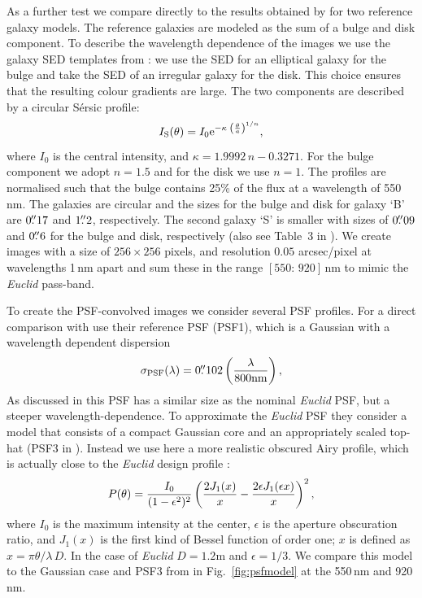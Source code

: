 \documentclass[useAMS,usenatbib]{mnras}
\newcommand{\be}{\begin{equation}}
\newcommand{\ee}{\end{equation}}
\newcommand{\rund}[1]{\left(#1\right)}
\def\elabel#1{\label{eq:#1}}
\begin{document}
As a further test we compare directly to the results obtained by  for two reference galaxy models. 
The reference galaxies are modeled as the sum of a bulge and disk component. To describe the wavelength dependence of the images we use the galaxy SED templates from \citet{1980ApJS...43..393C}: we use the SED for an elliptical galaxy for the bulge and take the SED of an irregular galaxy for the disk. This choice ensures that the resulting colour gradients are large. The two components are 
described by a circular S{\'e}rsic profile:
\be
I_{\rm S}(\theta) = I_0 {\rm e}^{-\kappa\; \left(\frac{\theta}{a}\right)^{1/n}},
\ee
%
where $I_0$ is the central intensity, and $\kappa=1.9992\,n -0.3271$. For the bulge component we adopt $n=1.5$ and for the disk we use $n=1$. The profiles are normalised such that the bulge contains 25\% of the flux at a wavelength of 550\,nm. The galaxies are circular and the sizes for the bulge and disk for galaxy `B'   are $0\hbox{$.\!\!^{\prime\prime}$}17$ and $1\hbox{$.\!\!^{\prime\prime}$}2$, respectively. The second galaxy `S' is smaller with sizes of $0\hbox{$.\!\!^{\prime\prime}$}09$ and $0\hbox{$.\!\!^{\prime\prime}$}6$  for the bulge and disk, respectively (also see Table~3 in ).
We create images with a size of  $256\times256$ pixels, and resolution $0.05$ arcsec/pixel at 
wavelengths 1\,nm apart and sum these in the range $[550:\,920]$\,nm to mimic the {\it Euclid} pass-band.

To create the PSF-convolved images we consider several PSF profiles. For a direct comparison with  use their reference PSF (PSF1), which is a Gaussian with a wavelength dependent dispersion
%
\be
\sigma_{\rm PSF}(\lambda) = 0\farcs102\rund{\lambda \over 800{\rm nm}},
\elabel{psf}
\ee
%
As discussed in  this PSF has a similar size as the nominal {\it Euclid} PSF, but a steeper wavelength-dependence. To approximate the {\it Euclid} PSF they consider a model that 
consists of a compact Gaussian core and an appropriately scaled top-hat (PSF3 in ).
Instead we use here a more realistic obscured Airy profile, which is actually close to the {\it Euclid}
design profile \citep{Laureijs11}:
%
\be
P(\theta) = {I_0 \over (1-\epsilon^2)^2} \rund{{2J_1(x)\over x} - {2\epsilon J_1(\epsilon x) \over x}}^2,
\elabel{psfairy}
\ee
%
where $I_0$ is the maximum intensity at the center, $\epsilon$ is the aperture obscuration ratio, and $J_1(x)$ is the first kind of Bessel function of order one; $x$ is defined as $x=\pi \theta/\lambda\, D $.
In the case of {\it Euclid} $D=1.2$m and $\epsilon=1/3$. We compare this model to the Gaussian
case and PSF3 from  in Fig.~\ref{fig:psfmodel} at the 550\,nm and 920\,nm.
\end{document}
